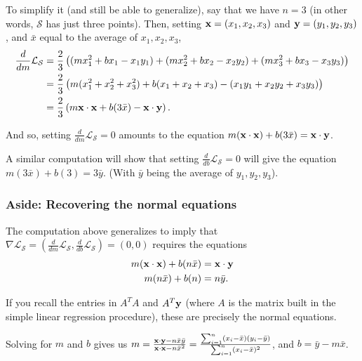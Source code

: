 \documentclass{beamer}
\theoremstyle{example}
\begin{document}
{\begin{frame}
    \pause
    To simplify it (and still be able to generalize), say that we have $n=3$ (in other words, $\mathcal S$ has just three points). Then, setting ${\bf x} = (x_1,x_2,x_3)$ and ${\bf y} = (y_1,y_2,y_3)$, and $\bar{x}$ equal to the average of $x_1,x_2,x_3$,
    \pause
    {\small
        \begin{align*}
            \frac{d}{dm}\mathcal L_{\mathcal S}     &= \frac{2}{3}\left((mx_1^2 + bx_1 - x_1y_1) + (mx_2^2 + bx_2 - x_2y_2) + (mx_3^2 + bx_3 - x_3y_3) \right) \\ 
                                                    &= \frac{2}{3}\left(m(x_1^2+x_2^2+x_3^2) + b(x_1+x_2+x_3) - (x_1y_1+x_2y_2+x_3y_3) \right) \\ 
                                                    &= \frac{2}{3}\left(m{\bf x}\cdot{\bf x} + b(3\bar{x}) - {\bf x}\cdot{\bf y}\right).
        \end{align*}
    }
    
    \pause
    And so, setting $\frac{d}{dm}\mathcal L_{\mathcal S} = 0$ amounts to the equation $m({\bf x}\cdot{\bf x}) + b(3\bar{x}) = {\bf x}\cdot{\bf y}$. 

    \pause
    A similar computation will show that setting $\frac{d}{db}\mathcal L_{\mathcal S} = 0$ will give the equation $m(3\bar{x}) + b(3) = 3\bar{y}$. (With $\bar{y}$ being the average of $y_1,y_2,y_3$). 
\end{frame}

\begin{frame}
    \frametitle{Aside: Recovering the normal equations}
    The computation above generalizes to imply that $\nabla\mathcal L_{\mathcal S} = (\frac{d}{dm}\mathcal L_{\mathcal S}, \frac{d}{db}\mathcal L_{\mathcal S}) = (0,0)$ requires the equations 
        \begin{align*}
            m({\bf x}\cdot{\bf x}) + b(n\bar{x})    &= {\bf x}\cdot{\bf y} \\ 
            m(n\bar{x}) + b(n)                      &= n\bar{y}.
        \end{align*}
    
    \pause 
    If you recall the entries in $A^TA$ and $A^T{\bf y}$ (where $A$ is the matrix built in the simple linear regression procedure), these are precisely the normal equations.

    Solving for $m$ and $b$ gives us $m = \frac{{\bf x}\cdot{\bf y} - n\bar{x}\bar{y}}{{\bf x}\cdot{\bf x} - n\bar{x}^2} = \frac{\sum_{i=1}^n(x_i - \bar{x})(y_i - \bar{y})}{\sum_{i=1}^n(x_i - \bar{x})^2}$, and $b = \bar{y} - m\bar{x}$.


\end{frame}}
\end{document}
